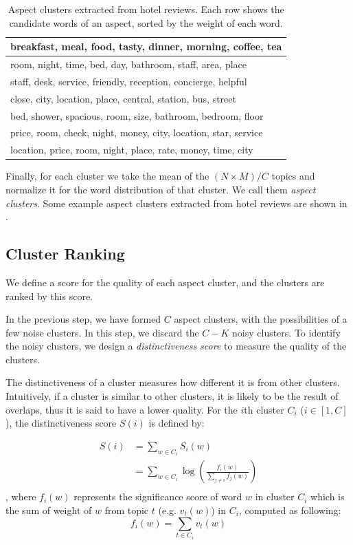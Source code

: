 \begin{table}[th]
\caption{Aspect clusters extracted from hotel reviews.
Each row shows the candidate words of an aspect, sorted by the weight of each word.}
\label{table:step3}
\centering
\begin{tabular}{|l|} \hline
breakfast, meal, food, tasty, dinner, morning, coffee, tea \\\hline
room, night, time, bed, day, bathroom, staff, area, place \\\hline
staff, desk, service, friendly, reception, concierge, helpful \\\hline
close, city, location, place, central, station, bus, street\\\hline
bed, shower, spacious, room, size, bathroom, bedroom, floor \\\hline
price, room, check, night, money, city, location, star, service \\\hline
location, price, room, night, place, rate, money, time, city  \\\hline
\end{tabular}
\end{table}

Finally, for each cluster we take the mean of the $(N\times M)/C$ topics and normalize it
for the word distribution of that cluster.
We call them {\em aspect clusters}.
Some example aspect clusters extracted from hotel reviews are 
shown in .

\subsection{Cluster Ranking}

We define a score for the quality of each aspect cluster,
and the clusters are ranked by this score.

In the previous step, we have formed $C$ aspect clusters, with the possibilities
of a few noise clusters.  In this step,
we discard the $C-K$ noisy clusters. 
To identify the noisy clusters, we design a {\em distinctiveness score} 
to measure the quality of the clusters. 

The distinctiveness of a cluster measures how different it is 
from other clusters. Intuitively, if a cluster is 
similar to other clusters, it is likely to be the result of overlaps,
thus it is said to have a lower quality. 
For the $i$th cluster $C_i$ ($i\in [1, C]$), 
the distinctiveness score $S(i)$ is defined by:

\begin{align}
S(i) &= \sum_{w\in C_i} S_i(w) \nonumber\\ 
     &= \sum_{w\in C_i} \log\left(\frac{f_i(w)}{\sum_{j\neq i} f_j(w)}\right)\nonumber \\
\end{align}
, where $f_i(w)$ represents the significance score of word $w$ in cluster $C_i$ which is the sum of weight of $w$ from topic $t$ (e.g. $v_t(w)$) in $C_i$, computed as following: 
\begin{equation}
    f_i(w) = \sum_{t\in C_i} v_t(w)
\end{equation}

